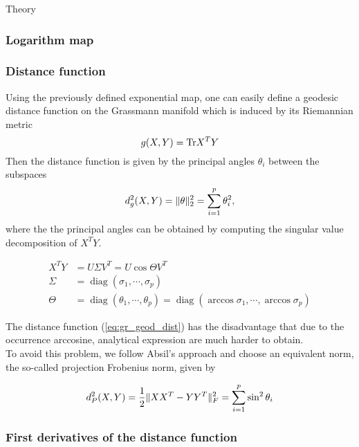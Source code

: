 \begin{chapter}{Theory}
\subsubsection{Logarithm map} %
\label{ssub:Logarithm map}


\subsubsection{Distance function} %
\label{ssub:Distance function}
Using the previously defined exponential map, one can easily define a geodesic distance function on the Grassmann manifold which is induced by its Riemannian metric
\begin{equation}
    g(X,Y) = \textnormal{Tr} X^TY
\end{equation}
Then the distance function is given by the principal angles $\theta_i$ between the subspaces 
\begin{equation}
    \label{eq:gr_geod_dist}
    d_g^2(X,Y) = \| \theta \|_2^2=\sum_{i=1}^p\theta_i^2,
\end{equation}
where the the principal angles can be obtained by computing the singular value decomposition of $X^TY$.

\begin{align}
    X^TY &= U\Sigma V^T = U\cos\Theta V^T\\
    \Sigma &= \operatorname{diag} (\sigma_1,\cdots,\sigma_p)\\
    \Theta &= \operatorname{diag} (\theta_1,\cdots,\theta_p) = \operatorname{diag} (\arccos\sigma_1,\cdots,\arccos\sigma_p)
\end{align}

The distance function (\ref{eq:gr_geod_dist}) has the disadvantage that due to the occurrence arccosine,
analytical expression are much harder to obtain.\\

To avoid this problem, we follow Absil's \cite{AbsilGrassmann} approach and choose an equivalent norm, the so-called projection Frobenius norm, given by

\begin{equation}
    d_P^2(X,Y) = \frac{1}{2}\| XX^T-YY^T \|_{F}^{2} = \sum_{i=1}^p\sin^2\theta_i
\end{equation}




\subsubsection{First derivatives of the distance function} %
\label{ssub:First derivatives of the distance function}


\end{chapter}
